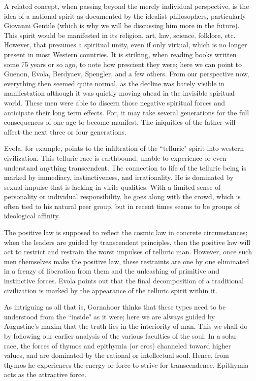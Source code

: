 A related concept, when passing beyond the merely individual perspective, is the idea of a national spirit as documented by the idealist philosophers, particularly Giovanni Gentile (which is why we will be discussing him more in the future). This spirit would be manifested in its religion, art, law, science, folklore, etc. However, that presumes a spiritual unity, even if only virtual, which is no longer present in most Western countries. It is striking, when reading books written some 75 years or so ago, to note how prescient they were; here we can point to Guenon, Evola, Berdyaev, Spengler, and a few others. From our perspective now, everything then seemed quite normal, as the decline was barely visible in manifestation although it was quietly moving ahead in the invisible spiritual world. These men were able to discern those negative spiritual forces and anticipate their long term effects. For, it may take several generations for the full consequences of one age to become manifest. The iniquities of the father will affect the next three or four generations.

Evola, for example, points to the infiltration of the ``telluric" spirit into western civilization. This telluric race is earthbound, unable to experience or even understand anything transcendent. The connection to life of the telluric being is marked by immediacy, instinctiveness, and irrationality. He is dominated by sexual impulse that is lacking in virile qualities. With a limited sense of personality or individual responsibility, he goes along with the crowd, which is often tied to his natural peer group, but in recent times seems to be groups of ideological affinity.

The positive law is supposed to reflect the cosmic law in concrete circumstances; when the leaders are guided by transcendent principles, then the positive law will act to restrict and restrain the worst impulses of telluric man. However, once such men themselves make the positive law, these restraints are one by one eliminated in a frenzy of liberation from them and the unleashing of primitive and instinctive forces. Evola points out that the final decomposition of a traditional civilization is marked by the appearance of the telluric spirit within it.

As intriguing as all that is, Gornahoor thinks that these types need to be understood from the ``inside" as it were; here we are always guided by Augustine's maxim that the truth lies in the interiority of man. This we shall do by following our earlier analysis of the various faculties of the soul. In a solar race, the forces of thymos and epithymia (or eros) channeled toward higher values, and are dominated by the rational or intellectual soul. Hence, from thymos he experiences the energy or force to strive for transcendence. Epithymia acts as the attractive force.

